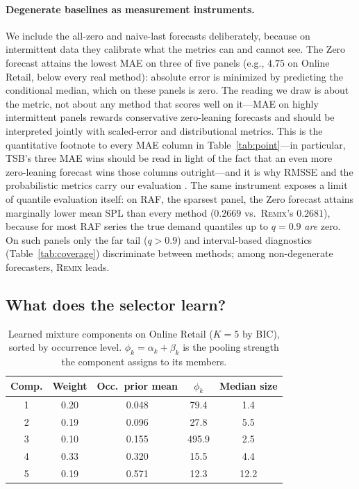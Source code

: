 \documentclass[twocolumn,10pt]{article}
\newcommand{\REMIX}{\textsc{Remix}}
\begin{document}
\paragraph{Degenerate baselines as measurement instruments.} We include
the all-zero and naive-last forecasts deliberately, because on
intermittent data they calibrate what the metrics can and cannot see.
The Zero forecast attains the lowest MAE on three of five panels (e.g.,
$4.75$ on Online Retail, below every real method): absolute error is
minimized by predicting the conditional median, which on these panels is
zero. The reading we draw is about the metric, not about any method that
scores well on it---MAE on highly intermittent panels rewards
conservative zero-leaning forecasts and should be interpreted jointly
with scaled-error and distributional metrics. This is the
quantitative footnote to every MAE column in Table~\ref{tab:point}---in
particular, TSB's three MAE wins should be read in light of the fact
that an even more zero-leaning forecast wins those columns
outright---and it is why RMSSE and the probabilistic metrics carry our
evaluation \citep{kolassa2016}. The same instrument exposes a limit of
quantile evaluation itself: on RAF, the sparsest panel, the Zero
forecast attains marginally lower mean SPL than every method
($0.2669$ vs.\ \REMIX{}'s $0.2681$), because for most RAF series the
true demand quantiles up to $q{=}0.9$ \emph{are} zero. On such panels
only the far tail ($q>0.9$) and interval-based diagnostics
(Table~\ref{tab:coverage}) discriminate between methods; among
non-degenerate forecasters, \REMIX{} leads.

\subsection{What does the selector learn?}\label{sec:selector}

\begin{table}[t]
\centering
\caption{Learned mixture components on Online Retail ($K{=}5$ by BIC),
sorted by occurrence level. $\phi_k=\alpha_k+\beta_k$ is the pooling
strength the component assigns to its members.}
\label{tab:components}
\small
\setlength{\tabcolsep}{4.2pt}
\begin{tabular}{ccccc}
\toprule
Comp. & Weight & Occ.\ prior mean & $\phi_k$ & Median size\\
\midrule
1 & 0.20 & 0.048 & 79.4 & 1.4\\
2 & 0.19 & 0.096 & 27.8 & 5.5\\
3 & 0.10 & 0.155 & 495.9 & 2.5\\
4 & 0.33 & 0.320 & 15.5 & 4.4\\
5 & 0.19 & 0.571 & 12.3 & 12.2\\
\bottomrule
\end{tabular}
\end{table}
\end{document}
